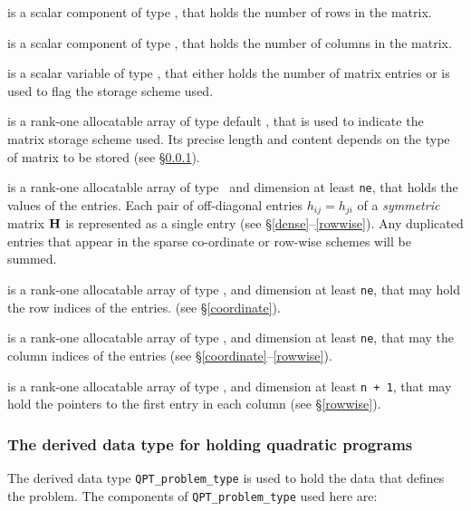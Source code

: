 \documentclass{galahad}
\begin{document}
\begin{description}

 is a scalar component of type \integer, 
that holds the number of rows in the matrix. 
 
 is a scalar component of type \integer, 
that holds the number of columns in the matrix. 
 
 is a scalar variable of type \integer, that either 
holds the number of matrix entries or is used to flag the storage scheme
used. 

 is a rank-one allocatable array of type default \character, that
is used to indicate the matrix storage scheme used. Its precise length and
content depends on the type of matrix to be stored (see \S\ref{typeqp}).

 is a rank-one allocatable array of type \realdp\, 
and dimension at least {\tt ne}, that holds the values of the entries. 
Each pair of off-diagonal entries $h_{ij} = h_{ji}$ of a {\em symmetric}
matrix ${\mathbf{H}}$ is represented as a single entry 
(see \S\ref{dense}--\ref{rowwise}).
Any duplicated entries that appear in the sparse 
co-ordinate or row-wise schemes will be summed. 

 is a rank-one allocatable array of type \integer, 
and dimension at least {\tt ne}, that may hold the row indices of the entries. 
(see \S\ref{coordinate}).

 is a rank-one allocatable array of type \integer, 
and dimension at least {\tt ne}, that may the column indices of the entries
(see \S\ref{coordinate}--\ref{rowwise}).

 is a rank-one allocatable array of type \integer, 
and dimension at least {\tt n + 1}, that may hold the pointers to
the first entry in each column (see \S\ref{rowwise}).

\end{description}


\subsubsection{The derived data type for holding quadratic programs}
\label{typeqp}

The derived data type 
{\tt QPT\_problem\_type}
is used to hold the data that defines the problem.
The components of 
{\tt QPT\_problem\_type} used here are:
\end{document}
